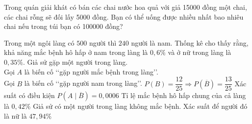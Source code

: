 %

\begin{ex}%
	Trong quán giải khát có bán các chai nước hoa quả với giả 15000 đồng một chai, các chai rỗng sẽ đối lấy 5000 đồng. Bạn có thể uống được nhiều nhất bao nhiêu chai nếu trong túi bạn có 100000 đồng?
\end{ex}

\begin{ex}%
	Trong một ngôi làng có $500$ người thì $240$ người là nam. Thống kê cho thấy rằng, khả năng mắc bệnh hô hấp ở nam trong làng là $0{,}6\%$ và ở nữ trong làng là $0{,}35\%$. Giả sử gặp  một người trong làng.\\
	Gọi $A$ là biến cố \lq\lq gặp người mắc bệnh trong làng\rq\rq.\\
	Gọi $B$ là biến cố \lq\lq gặp người nam trong làng\rq\rq.
	\choiceTF
	{\True $P(B) = \dfrac{12}{25} \Rightarrow P(\overline{B}) = \dfrac{13}{25}$}
	{Xác suất có điều kiện $P(A \mid \overline{B}) = 0{,}0006$}
	{Tỉ lệ mắc bệnh hô hấp chung của cả làng là $0{,}42\%$}
	{Giả sử có một người trong làng không mắc bệnh. Xác suất để người đó là nữ là $47{,}94\%$}
	
\end{ex}


